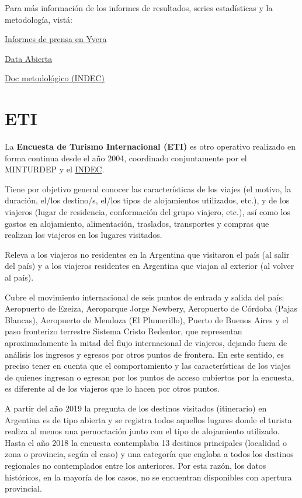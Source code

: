 \documentclass[
  openany]{book}
\begin{document}
Para más información de los informes de resultados, series estadísticas y la metodología, vistá:

\href{https://www.yvera.tur.ar/estadistica/informe/info/encuesta-de-ocupacion-hotelera-eoh}{Informes de prensa en Yvera}

\href{http://datos.yvera.tur.ar/dataset/encuesta-ocupacion-hotelera-parahotelera-eoh}{Data Abierta}

\href{https://www.indec.gob.ar/ftp/cuadros/economia/eoh_aspectos_metodologicos.pdf}{Doc metodológico (INDEC)}

\hypertarget{eti}{%
\section{ETI}\label{eti}}

La \textbf{Encuesta de Turismo Internacional (ETI)} es otro operativo realizado en forma continua desde el año 2004, coordinado conjuntamente por el MINTURDEP y el \href{https://www.indec.gob.ar/indec/web/Nivel4-Tema-3-13-55}{INDEC}.

Tiene por objetivo general conocer las características de los viajes (el motivo, la duración, el/los destino/s, el/los tipos de alojamientos utilizados, etc.), y de los viajeros (lugar de residencia, conformación del grupo viajero, etc.), así como los gastos en alojamiento, alimentación, traslados, transportes y compras que realizan los viajeros en los lugares visitados.

Releva a los viajeros no residentes en la Argentina que visitaron el país (al salir del país) y a los viajeros residentes en Argentina que viajan al exterior (al volver al país).

Cubre el movimiento internacional de seis puntos de entrada y salida del país: Aeropuerto de Ezeiza, Aeroparque Jorge Newbery, Aeropuerto de Córdoba (Pajas Blancas), Aeropuerto de Mendoza (El Plumerillo), Puerto de Buenos Aires y el paso fronterizo terrestre Sistema Cristo Redentor, que representan aproximadamente la mitad del flujo internacional de viajeros, dejando fuera de análisis los ingresos y egresos por otros puntos de frontera.
En este sentido, es preciso tener en cuenta que el comportamiento y las características de los viajes de quienes ingresan o egresan por los puntos de acceso cubiertos por la encuesta, es diferente al de los viajeros que lo hacen por otros puntos.

A partir del año 2019 la pregunta de los destinos visitados (itinerario) en Argentina es de tipo abierta y se registra todos aquellos lugares donde el turista realiza al menos una pernoctación junto con el tipo de alojamiento utilizado.
Hasta el año 2018 la encuesta contemplaba 13 destinos principales (localidad o zona o provincia, según el caso) y una categoría que engloba a todos los destinos regionales no contemplados entre los anteriores.
Por esta razón, los datos históricos, en la mayoría de los casos, no se encuentran disponibles con apertura provincial.
\end{document}
